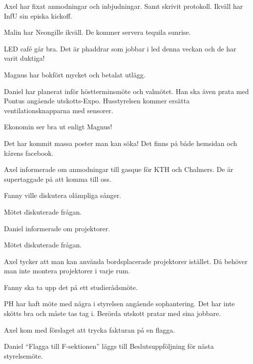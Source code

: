 \documentclass[10pt]{article}
\begin{document}
\begin{paragrafer}
\begin{paragrafer}
        Axel har fixat anmodningar och inbjudningar. Samt skrivit protokoll. Ikväll har InfU sin episka kickoff.

        Malin har Neongille ikväll. De kommer servera tequila sunrise.

        LED café går bra. Det är phaddrar som jobbar i led denna veckan och de har varit duktiga!

        Magnus har bokfört mycket och betalat utlägg.

        Daniel har planerat inför höstterminsmöte och valmötet. Han ska även prata med Pontus angående utskotts-Expo.
        Husstyrelsen kommer ersätta ventilationsknapparna med sensorer.


        Ekonomin ser bra ut enligt Magnus!

        Det har kommit massa poster man kan söka! Det finns på både hemsidan och kårens facebook. 

        Axel informerade om anmodningar till gasque för KTH och Chalmers. De är supertaggade på att komma till oss.
    
    \end{paragrafer}
        

    Fanny ville diskutera olämpliga sånger.

    Mötet diskuterade frågan.

    
    Daniel informerade om projektorer.

    Mötet diskuterade frågan. 

    Axel tycker att man kan använda bordsplacerade projektorer istället. Då behöver man inte montera projektorer i varje rum.

    Fanny ska ta upp det på ett studierådsmöte.


    PH har haft möte med några i styrelsen angående sophantering. Det har inte skötts bra och måste tas tag i. 
    Berörda utskott pratar med sina jobbare. 

    Axel kom med förslaget att trycka fakturan på en flagga.

    Daniel \ypa ``Flagga till F-sektionen'' läggs till Beslutsuppföljning för nästa styrelsemöte.


\end{paragrafer}
\end{document}
